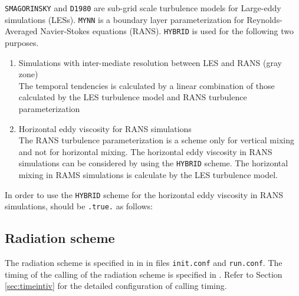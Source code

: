 \verb|SMAGORINSKY| and \verb|D1980| are sub-grid scale turbulence models for Large-eddy simulations (LESs).
\verb|MYNN| is a boundary layer parameterization for Reynolds-Averaged Navier-Stokes equations (RANS).
\verb|HYBRID| is used for the following two purposes.
\begin{enumerate}
\item Simulations with inter-mediate resolution between LES and RANS (gray zone) \\
  The temporal tendencies is calculated by a linear combination of those calculated by the LES turbulence model and RANS turbulence parameterization
\item Horizontal eddy viscosity for RANS simulations \\
  The RANS turbulence parameterization is a scheme only for vertical mixing and not for horizontal mixing.
  The horizontal eddy viscosity in RANS simulations can be considered by using the \verb|HYBRID| scheme.
  The horizontal mixing in RAMS simulations is calculate by the LES turbulence model.
\end{enumerate}

In order to use the \verb|HYBRID| scheme for the horizontal eddy viscosity in RANS simulations,  should be \verb|.true.| as follows:


\subsection{Radiation scheme} \label{subsec:basic_usel_radiation}
The radiation scheme is specified in  in  in files \verb|init.conf| and \verb|run.conf|. The timing of the calling of the radiation scheme is specified in .  Refer to Section \ref{sec:timeintiv} for the detailed configuration of calling timing.


